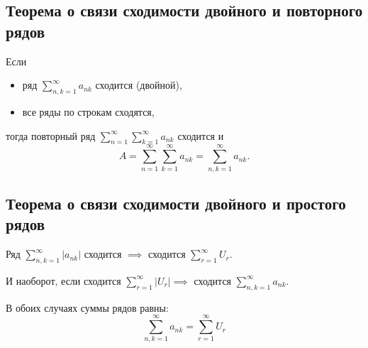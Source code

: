 \subsection{Теорема о связи сходимости двойного и повторного рядов}

\begin{theorem}
    Если
    \begin{itemize}
        \item ряд $ \sum_{n,k = 1}^{\infty} a_{nk} $ сходится (двойной),
        \item все ряды по строкам сходятся,
    \end{itemize}
    тогда повторный ряд $ \sum_{n=1}^{\infty}\sum_{k=1}^{\infty}a_{nk} $ сходится и
    \[
        A = \sum_{n=1}^{\infty}\sum_{k=1}^{\infty}a_{nk} = \sum_{n,k=1}^{\infty}a_{nk}.
    \]
\end{theorem}

\subsection{Теорема о связи сходимости двойного и простого рядов}

\begin{theorem}
    Ряд $ \sum_{n,k = 1}^{\infty} |a_{nk}| $ сходится $ \implies $ сходится $ \sum_{r=1}^{\infty}U_r $.

    И наоборот, если сходится $ \sum_{r=1}^{\infty}|U_r| \implies $ сходится $ \sum_{n,k = 1}^{\infty} a_{nk} $.

    В обоих случаях суммы рядов равны:
    \[
        \sum_{n,k=1}^{\infty}a_{nk} = \sum_{r=1}^{\infty}U_r
    \]
\end{theorem}
